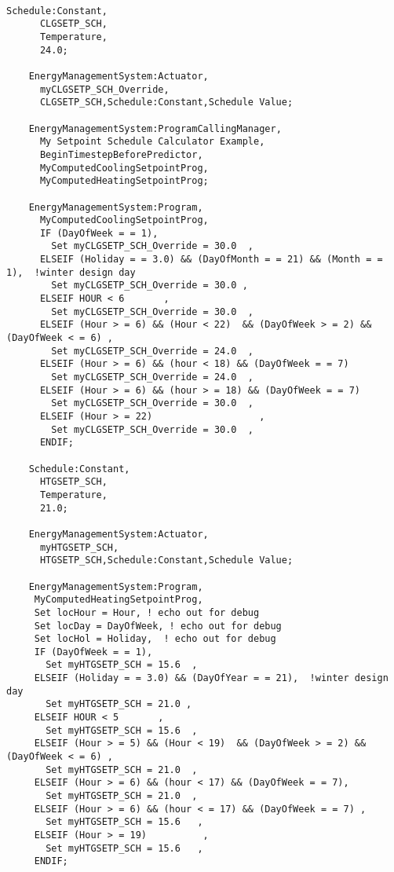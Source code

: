 \begin{lstlisting}

Schedule:Constant,
      CLGSETP_SCH,
      Temperature,
      24.0;

    EnergyManagementSystem:Actuator,
      myCLGSETP_SCH_Override,
      CLGSETP_SCH,Schedule:Constant,Schedule Value;

    EnergyManagementSystem:ProgramCallingManager,
      My Setpoint Schedule Calculator Example,
      BeginTimestepBeforePredictor,
      MyComputedCoolingSetpointProg,
      MyComputedHeatingSetpointProg;

    EnergyManagementSystem:Program,
      MyComputedCoolingSetpointProg,
      IF (DayOfWeek = = 1),
        Set myCLGSETP_SCH_Override = 30.0  ,
      ELSEIF (Holiday = = 3.0) && (DayOfMonth = = 21) && (Month = = 1),  !winter design day
        Set myCLGSETP_SCH_Override = 30.0 ,
      ELSEIF HOUR < 6       ,
        Set myCLGSETP_SCH_Override = 30.0  ,
      ELSEIF (Hour > = 6) && (Hour < 22)  && (DayOfWeek > = 2) && (DayOfWeek < = 6) ,
        Set myCLGSETP_SCH_Override = 24.0  ,
      ELSEIF (Hour > = 6) && (hour < 18) && (DayOfWeek = = 7)
        Set myCLGSETP_SCH_Override = 24.0  ,
      ELSEIF (Hour > = 6) && (hour > = 18) && (DayOfWeek = = 7)
        Set myCLGSETP_SCH_Override = 30.0  ,
      ELSEIF (Hour > = 22)                   ,
        Set myCLGSETP_SCH_Override = 30.0  ,
      ENDIF;

    Schedule:Constant,
      HTGSETP_SCH,
      Temperature,
      21.0;

    EnergyManagementSystem:Actuator,
      myHTGSETP_SCH,
      HTGSETP_SCH,Schedule:Constant,Schedule Value;

    EnergyManagementSystem:Program,
     MyComputedHeatingSetpointProg,
     Set locHour = Hour, ! echo out for debug
     Set locDay = DayOfWeek, ! echo out for debug
     Set locHol = Holiday,  ! echo out for debug
     IF (DayOfWeek = = 1),
       Set myHTGSETP_SCH = 15.6  ,
     ELSEIF (Holiday = = 3.0) && (DayOfYear = = 21),  !winter design day
       Set myHTGSETP_SCH = 21.0 ,
     ELSEIF HOUR < 5       ,        
       Set myHTGSETP_SCH = 15.6  ,
     ELSEIF (Hour > = 5) && (Hour < 19)  && (DayOfWeek > = 2) && (DayOfWeek < = 6) ,
       Set myHTGSETP_SCH = 21.0  ,
     ELSEIF (Hour > = 6) && (hour < 17) && (DayOfWeek = = 7),
       Set myHTGSETP_SCH = 21.0  ,
     ELSEIF (Hour > = 6) && (hour < = 17) && (DayOfWeek = = 7) ,
       Set myHTGSETP_SCH = 15.6   ,
     ELSEIF (Hour > = 19)          ,
       Set myHTGSETP_SCH = 15.6   ,
     ENDIF;
\end{lstlisting}
